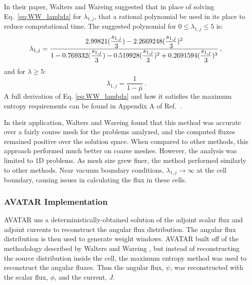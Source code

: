 In their paper, Walters and Wareing \cite{walters_accurate_1996} suggested that in place of
solving Eq.\ \eqref{eq:WW_lambda} for $\lambda_{1,j}$, that a rational polynomial
be used in its place to reduce computational time. The
suggested polynomial for $0 \leq \lambda_{1,j} \leq 5$ is:
\newcommand{\lamvar}{\dfrac{s_{1,j}}{3}}
\begin{equation}
  \lambda_{1,j} =  \dfrac{2.99821 (\lamvar) - 2.2669248 (\lamvar)^2 }{1 - 0.769332
             (\lamvar) -0.519928 (\lamvar)^2 + 0.2691594 (\lamvar)^3} \:, \\
\end{equation}
and for $\lambda \geq 5$:
\begin{equation}
  \lambda_{1,j} = \frac{1}{1-\bar\mu} \:.
\end{equation}
A full derivation of Eq. \eqref{eq:WW_lambda} and how it satisfies the maximum
entropy requirements can be found in Appendix A of Ref.\
\cite{walters_accurate_1996}.

In their application, Walters and Wareing found that this method was accurate
over a fairly course mesh for the problems analyzed, and the computed fluxes
remained positive over the solution space. When compared to other methods, this
approach performed much better on coarse meshes. However, the analysis was
limited to 1D problems. As mesh size grew finer, the method
performed similarly to other methods. Near vacuum boundary conditions,
$\lambda_{1,j} \rightarrow \infty$ at the cell boundary, causing issues in
calculating the flux in these cells.

\subsubsection*{AVATAR Implementation}

AVATAR uss a deterministically-obtained solution of the adjoint scalar flux and
adjoint currents to
reconstruct the angular flux distribution. The angular flux distribution is then
used to generate weight windows.
AVATAR built off of the methodology described by Walters and Wareing
\cite{walters_nonlinear_1994, walters_accurate_1996}, but instead of
reconstructing the source distribution inside the cell, the maximum entropy
method was used to reconstruct the angular fluxes. Thus the angular flux,
$\psi$,
was reconstructed with the scalar flux, $\phi$, and the current, $J$.

